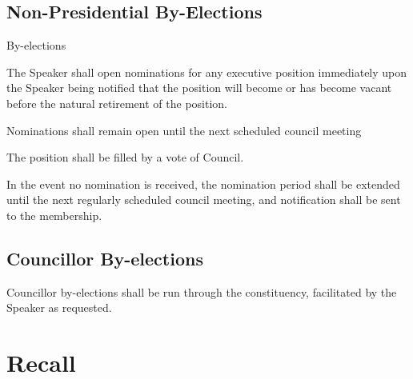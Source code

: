 \subsection {Non-Presidential By-Elections}
\begin{longenum}[ label*=\thesubsection.\arabic*., align=left]
\item By-elections
	\begin{longenum}[ label*=\arabic*., align=left]
		\item The Speaker shall open nominations for any executive position immediately upon the Speaker being
notified that the position will become or has become vacant before the natural retirement of the position. 
		\item Nominations shall remain open until the next scheduled council meeting
		\item The position shall be filled by a vote of Council.
		\item In the event no nomination is received, the nomination period shall be extended until the next regularly scheduled council meeting, and notification shall be sent to the membership.
	\end{longenum}
\end{longenum}    
\subsection{Councillor By-elections}
\begin{longenum}[ label*=\thesubsection.\arabic*., align=left]
	\item Councillor by-elections shall be run through the constituency, facilitated by the Speaker as requested.
\end{longenum}    
\newpage

\section{Recall}

